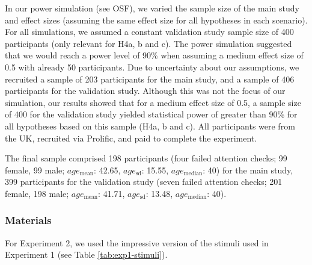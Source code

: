 \documentclass[
  doc,floatsintext]{apa6}
\begin{document}
In our power simulation (see OSF), we varied the sample size of the main study and effect sizes (assuming the same effect size for all hypotheses in each scenario). For all simulations, we assumed a constant validation study sample size of 400 participants (only relevant for H4a, b and c). The power simulation suggested that we would reach a power level of 90\% when assuming a medium effect size of 0.5 with already 50 participants. Due to uncertainty about our assumptions, we recruited a sample of 203 participants for the main study, and a sample of 406 participants for the validation study. Although this was not the focus of our simulation, our results showed that for a medium effect size of 0.5, a sample size of 400 for the validation study yielded statistical power of greater than 90\% for all hypotheses based on this sample (H4a, b and c). All participants were from the UK, recruited via Prolific, and paid to complete the experiment.

The final sample comprised 198 participants (four failed attention checks; 99 female, 99 male; \(age_\text{mean}\): 42.65, \(age_\text{sd}\): 15.55, \(age_\text{median}\): 40) for the main study, 399 participants for the validation study (seven failed attention checks; 201 female, 198 male; \(age_\text{mean}\): 41.71, \(age_\text{sd}\): 13.48, \(age_\text{median}\): 40).

\subsubsection{Materials}\label{materials-1}

For Experiment 2, we used the impressive version of the stimuli used in Experiment 1 (see Table \ref{tab:exp1-stimuli}).
\end{document}
